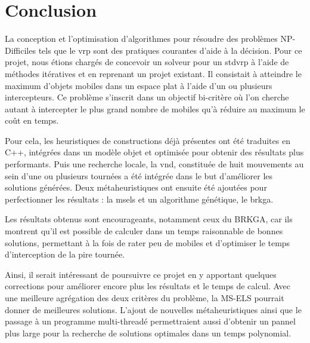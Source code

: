 \chapter*{Conclusion}

La conception et l'optimisation d'algorithmes pour résoudre des problèmes NP-Difficiles tels que le \acrlong{vrp} sont des pratiques courantes d'aide à la décision. Pour ce projet, nous étions chargés de concevoir un solveur pour un \acrlong{stdvrp} à l'aide de méthodes itératives et en reprenant un projet existant. Il consistait à atteindre le maximum d'objets mobiles dans un espace plat à l'aide d'un ou plusieurs intercepteurs. Ce problème s'inscrit dans un objectif bi-critère où l'on cherche autant à intercepter le plus grand nombre de mobiles qu'à réduire au maximum le coût en temps.

Pour cela, les heuristiques de constructions déjà présentes ont été traduites en C++, intégrées dans un modèle objet et optimisée pour obtenir des résultats plus performants. Puis une recherche locale, la \acrlong{vnd}, constituée de huit mouvements au sein d'une ou plusieurs tournées a été intégrée dans le but d'améliorer les solutions générées. Deux métaheuristiques ont ensuite été ajoutées pour perfectionner les résultats : la \acrlong{msels} et un algorithme génétique, le \acrlong{brkga}.

Les résultats obtenus sont encourageants, notamment ceux du BRKGA, car ils montrent qu'il est possible de calculer dans un temps raisonnable de bonnes solutions, permettant à la fois de rater peu de mobiles et d'optimiser le temps d'interception de la pire tournée.

Ainsi, il serait intéressant de poursuivre ce projet en y apportant quelques corrections pour améliorer encore plus les résultats et le temps de calcul. Avec une meilleure agrégation des deux critères du problème, la MS-ELS pourrait donner de meilleures solutions. L'ajout de nouvelles métaheuristiques ainsi que le passage à un programme multi-threadé permettraient aussi d'obtenir un pannel plus large pour la recherche de solutions optimales dans un temps polynomial.

